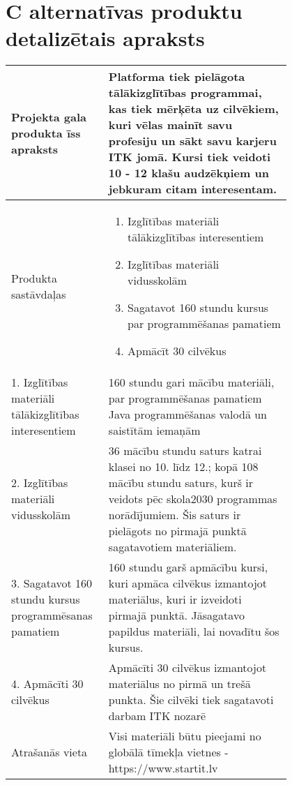 \section{C alternatīvas produktu detalizētais apraksts}
    \label{app:C_detalizetais_aprkasts}
    \begin{table}[!ht]
        \centering
        \begin{tabular}{|p{0.2\linewidth}|p{0.6\linewidth}|}
            \hline
            Projekta gala produkta īss apraksts & 
            Platforma tiek pielāgota tālākizglītības programmai, kas tiek mērķēta
            uz cilvēkiem, kuri vēlas mainīt savu profesiju un sākt savu karjeru
            ITK jomā. Kursi tiek veidoti 10 - 12 klašu audzēkņiem un jebkuram citam interesentam.
            \\
            \hline
            Produkta sastāvdaļas &
            \begin{enumerate}
                \item Izglītības materiāli tālākizglītības interesentiem
                \item Izglītības materiāli vidusskolām
                \item Sagatavot 160 stundu kursus par programmēšanas pamatiem
                \item Apmācīt 30 cilvēkus
            \end{enumerate} \\
            \hline
            1. Izglītības materiāli tālākizglītības interesentiem & 
            160 stundu gari mācību materiāli, par programmēšanas pamatiem
            Java programmēšanas valodā un saistītām iemaņām
            \\
            \hline
            2. Izglītības materiāli vidusskolām & 
            36 mācību stundu saturs katrai klasei no 10. līdz 12.; kopā 108 mācību
            stundu saturs, kurš ir veidots pēc skola2030 programmas norādījumiem.
            Šis saturs ir pielāgots no pirmajā punktā sagatavotiem materiāliem.
            \\
            \hline
            3. Sagatavot 160 stundu kursus programmēsanas pamatiem & 
            160 stundu garš apmācību kursi, kuri apmāca cilvēkus izmantojot
            materiālus, kuri ir izveidoti pirmajā punktā. Jāsagatavo papildus materiāli,
            lai novadītu šos kursus. 
            \\
            \hline
            4. Apmācīti 30 cilvēkus &
            Apmācīti 30 cilvēkus izmantojot materiālus no pirmā un trešā punkta.
            Šie cilvēki tiek sagatavoti darbam ITK nozarē \\
            \hline
            Atrašanās vieta & Visi materiāli būtu pieejami no globālā tīmekļa vietnes - https://www.startit.lv \\
            \hline
        \end{tabular}
    \end{table}
    \clearpage

